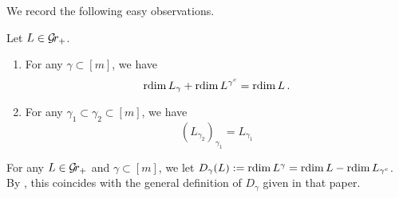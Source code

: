 \documentclass{article} %
\begin{document}
We record the following easy observations.
\begin{lemma} \label{le:rdimTrans} Let $ L \in \mathcal{G}\!r_+$.
\begin{enumerate}
    \item For any $ 
    \gamma \subset [m] $, we have $$ \operatorname{rdim} L_\gamma + \operatorname{rdim} L^{\gamma^c} = \operatorname{rdim} L \,.$$
    \item For any $ \gamma_1 \subset \gamma_2 \subset [m]$, we have $$ (L_{\gamma_2})_{\gamma_1} = L_{\gamma_1}
$$
\end{enumerate}
\end{lemma}

For any $ L \in \mathcal{G}\!r_+ $ and $\gamma \subset [m]$, we let $ D_\gamma(L) := \operatorname{rdim} L^\gamma = \operatorname{rdim} L - \operatorname{rdim} L_{\gamma^c}$. By \cite[Proposition 9.3]{kamnitzer2010mirkovic}, this coincides with the general definition of $ D_\gamma$ given in that paper. 
\end{document}
